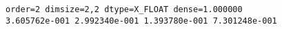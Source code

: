 \begin{tcolorbox}[enhanced,width=11cm,frame engine=empty,boxrule=0.1mm,size=title,colback=black!10!white]
\begin{flushleft}
{\scriptsize
\begin{tabbing}
\texttt{order=2 dimsize=2,2 dtype=X\_FLOAT dense=1.000000} \\
\texttt{3.605762e-001 2.992340e-001 1.393780e-001 7.301248e-001}
\end{tabbing}
}
\end{flushleft}
\end{tcolorbox}

